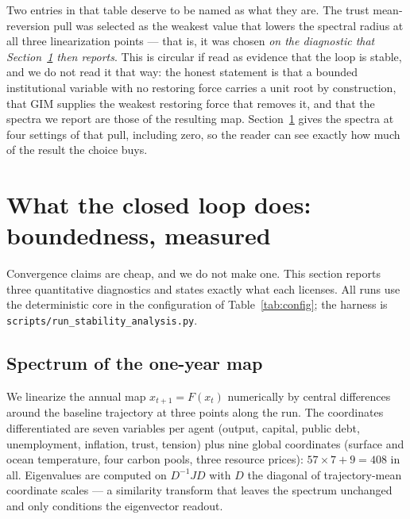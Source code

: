 \documentclass[12pt,a4paper]{article}
\newcommand{\nStateJac}{408}
\begin{document}
Two entries in that table deserve to be named as what they are. The trust mean-reversion pull
was selected as the weakest value that lowers the spectral radius at all three linearization
points --- that is, it was chosen \emph{on the diagnostic that Section~\ref{sec:stability}
then reports}. This is circular if read as evidence that the loop is stable, and we do not
read it that way: the honest statement is that a bounded institutional variable with no
restoring force carries a unit root by construction, that GIM supplies the weakest restoring
force that removes it, and that the spectra we report are those of the resulting map.
Section~\ref{sec:stability} gives the spectra at four settings of that pull, including zero,
so the reader can see exactly how much of the result the choice buys.

\section{What the closed loop does: boundedness, measured}
\label{sec:stability}

Convergence claims are cheap, and we do not make one. This section reports three quantitative
diagnostics and states exactly what each licenses. All runs use the deterministic core in the
configuration of Table~\ref{tab:config}; the harness is
\texttt{scripts/run\_stability\_analysis.py}.

\subsection{Spectrum of the one-year map}

We linearize the annual map $x_{t+1}=F(x_t)$ numerically by central differences around the
baseline trajectory at three points along the run. The coordinates differentiated are seven
variables per agent (output, capital, public debt, unemployment, inflation, trust, tension)
plus nine global coordinates (surface and ocean temperature, four carbon pools, three resource
prices): $57\times7+9=\nStateJac$ in all. Eigenvalues are computed on $D^{-1}JD$ with $D$ the
diagonal of trajectory-mean coordinate scales --- a similarity transform that leaves the
spectrum unchanged and only conditions the eigenvector readout.
\end{document}
